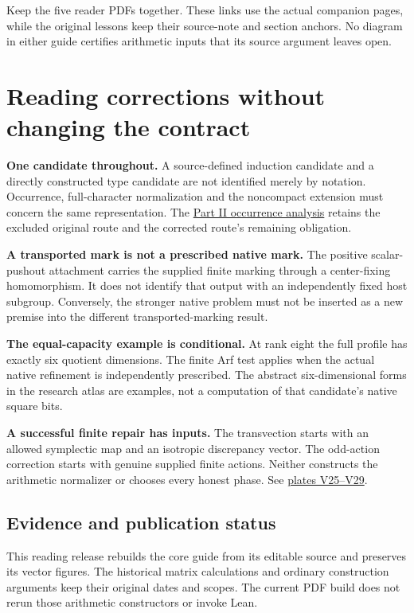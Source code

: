 Keep the five reader PDFs together. These links use the actual companion pages, while the original lessons keep their source-note and section anchors. No diagram in either guide certifies arithmetic inputs that its source argument leaves open.
\clearpage
\section*{Reading corrections without changing the contract}
{}
\textbf{One candidate throughout.} A source-defined induction candidate and a directly constructed type candidate are not identified merely by notation. Occurrence, full-character normalization and the noncompact extension must concern the same representation. The \href{https://komorebi.invalid/b07/visual_occurrence}{Part II occurrence analysis} retains the excluded original route and the corrected route's remaining obligation.

\textbf{A transported mark is not a prescribed native mark.} The positive scalar-pushout attachment carries the supplied finite marking through a center-fixing homomorphism. It does not identify that output with an independently fixed host subgroup. Conversely, the stronger native problem must not be inserted as a new premise into the different transported-marking result.

\textbf{The equal-capacity example is conditional.} At rank eight the full profile has exactly six quotient dimensions. The finite Arf test applies when the actual native refinement is independently prescribed. The abstract six-dimensional forms in the research atlas are examples, not a computation of that candidate's native square bits.

\textbf{A successful finite repair has inputs.} The transvection starts with an allowed symplectic map and an isotropic discrepancy vector. The odd-action correction starts with genuine supplied finite actions. Neither constructs the arithmetic normalizer or chooses every honest phase. See \href{https://komorebi.invalid/b07/visual_repairs}{plates V25--V29}.

\subsection*{Evidence and publication status}
This reading release rebuilds the core guide from its editable source and preserves its vector figures. The historical matrix calculations and ordinary construction arguments keep their original dates and scopes. The current PDF build does not rerun those arithmetic constructors or invoke Lean.

